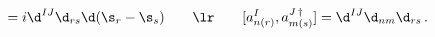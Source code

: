 \begin{equation}
[x_r^I(\s_r),p_s^J(\s_s)]=i\d^{IJ}\d_{rs}\d(\s_r-\s_s)\qquad\lr\qquad [a_{n(r)}^I,a_{m(s)}^{J\,\dag}]=\d^{IJ}\d_{nm}\d_{rs}\,.
\end{equation}

